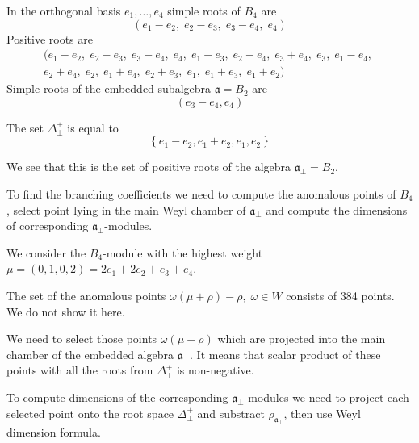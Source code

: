 \documentclass[a4paper,12pt]{article}
\theoremstyle{definition} \newtheorem{Def}{Definition}
\begin{document}
In the orthogonal basis $e_1,\dots,e_4$ simple roots of $B_4$ are
\begin{equation}
  \label{eq:8}
  (e_1 - e_2,\; e_2 - e_3,\; e_3 - e_4,\; e_4)
\end{equation}
Positive roots are
\begin{multline}
  \label{eq:19}
  (e_1 - e_2,\; e_2 - e_3,\; e_3 - e_4,\; e_4,\; e_1 - e_3,\; e_2 - e_4,\; e_3 + e_4,\; e_3,\; e_1 - e_4,\;\\
    e_2 + e_4,\; e_2,\; e_1 + e_4,\; e_2 + e_3,\; e_1,\; e_1 + e_3,\; e_1 + e_2)
\end{multline}
Simple roots of the embedded subalgebra $\mathfrak{a}=B_2$ are
\begin{equation}
  \label{eq:26}
  (e_3-e_4,e_4)
\end{equation}

The set $\Delta^{+}_{\bot}$ is equal to
\begin{equation}
  \label{eq:27}
  \left\{e_1-e_2,e_1+e_2,e_1,e_2\right\}
\end{equation}

We see that this is the set of positive roots of the algebra $\mathfrak{a}_{\bot}=B_2$.

To find the branching coefficients we need to compute the anomalous points of $B_4$, select point lying in the main Weyl chamber of $\mathfrak{a}_{\bot}$ and compute the dimensions of corresponding $\mathfrak{a}_{\bot}$-modules.

We consider the $B_4$-module with the highest weight $\mu=(0,1,0,2)=2
e_1 + 2 e_2 + e_3 + e_4$.

The set of the anomalous points $\omega(\mu+\rho)-\rho,\; \omega\in W$
consists of 384 points. We do not show it here.

We need to select those points $\omega(\mu+\rho)$  which are projected into the main chamber of the embedded algebra $\mathfrak{a}_{\bot}$.
It means that scalar product of these points with all the roots from $\Delta^{+}_{\bot}$ is non-negative.

To compute dimensions of the corresponding
$\mathfrak{a}_{\bot}$-modules we need to project each selected point
onto the root space $\Delta^{+}_{\bot}$ and substract
$\rho_{\mathfrak{a}_{\bot}}$, then use Weyl dimension formula.
\end{document}
